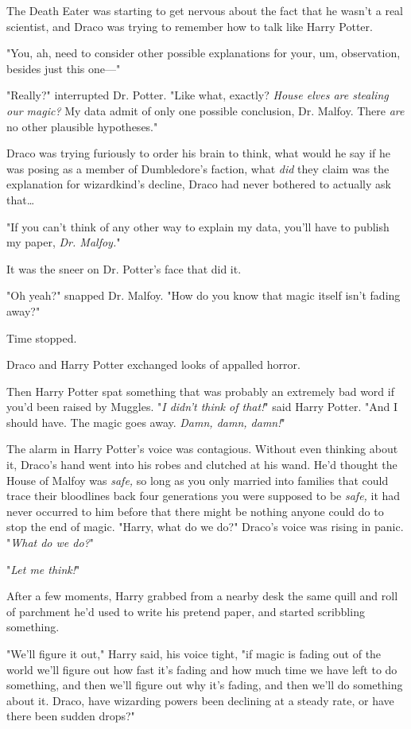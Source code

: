 The Death Eater was starting to get nervous about the fact that he wasn't a 
real scientist, and Draco was trying to remember how to talk like Harry Potter.

"You, ah, need to consider other possible explanations for your, um, 
observation, besides just this one---"

"Really?" interrupted Dr. Potter. "Like what, exactly? \emph{House elves are 
stealing our magic?} My data admit of only one possible conclusion, Dr. Malfoy. 
There \emph{are} no other plausible hypotheses."

Draco was trying furiously to order his brain to think, what would he say if he 
was posing as a member of Dumbledore's faction, what \emph{did} they claim was 
the explanation for wizardkind's decline, Draco had never bothered to actually 
ask that{\ldots}

"If you can't think of any other way to explain my data, you'll have to publish 
my paper, \emph{Dr. Malfoy.}"

It was the sneer on Dr. Potter's face that did it.

"Oh yeah?" snapped Dr. Malfoy. "How do you know that magic itself isn't fading 
away?"

Time stopped.

Draco and Harry Potter exchanged looks of appalled horror.

Then Harry Potter spat something that was probably an extremely bad word if 
you'd been raised by Muggles. "\emph{I didn't think of that!}" said Harry 
Potter. "And I should have. The magic goes away. \emph{Damn, damn, damn!}"

The alarm in Harry Potter's voice was contagious. Without even thinking about 
it, Draco's hand went into his robes and clutched at his wand. He'd thought the 
House of Malfoy was \emph{safe,} so long as you only married into families that 
could trace their bloodlines back four generations you were supposed to be 
\emph{safe,} it had never occurred to him before that there might be nothing 
anyone could do to stop the end of magic. "Harry, what do we do?" Draco's voice 
was rising in panic. "\emph{What do we do?}"

"\emph{Let me think!}"

After a few moments, Harry grabbed from a nearby desk the same quill and roll 
of parchment he'd used to write his pretend paper, and started scribbling 
something.

"We'll figure it out," Harry said, his voice tight, "if magic is fading out of 
the world we'll figure out how fast it's fading and how much time we have left 
to do something, and then we'll figure out why it's fading, and then we'll do 
something about it. Draco, have wizarding powers been declining at a steady 
rate, or have there been sudden drops?"

